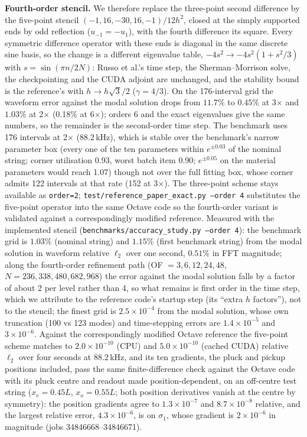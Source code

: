 \documentclass[a4paper,10pt]{article}
\begin{document}
\textbf{Fourth-order stencil.} We therefore replace the three-point second difference by the five-point stencil $(-1,16,-30,16,-1)/12h^2$, closed at the simply supported ends by odd reflection ($u_{-1}=-u_1$), with the fourth difference its square. Every symmetric difference operator with these ends is diagonal in the same discrete sine basis, so the change is a different eigenvalue table, $-4s^2\to-4s^2(1+s^2/3)$ with $s=\sin(\pi n/2N)$: Russo et al.'s time step, the Sherman--Morrison solve, the checkpointing and the CUDA adjoint are unchanged, and the stability bound is the reference's with $h\to h\sqrt{3}/2$ ($\gamma=4/3$). On the 176-interval grid the waveform error against the modal solution drops from $11.7\%$ to $0.45\%$ at 3$\times$ and $1.03\%$ at 2$\times$ (0.18\% at 6$\times$); orders 6 and the exact eigenvalues give the same numbers, so the remainder is the second-order time step. The benchmark uses 176 intervals at 2$\times$ (88.2\,kHz), which is stable over the benchmark's narrow parameter box (every one of the ten parameters within $e^{\pm0.03}$ of the nominal string; corner utilisation 0.93, worst batch item 0.90; $e^{\pm0.05}$ on the material parameters would reach 1.07) though not over the full fitting box, whose corner admits 122 intervals at that rate (152 at 3$\times$). The three-point scheme stays available as \texttt{order=2}; \texttt{test/reference\_paper\_exact.py --order 4} substitutes the five-point operator into the same Octave code so the fourth-order variant is validated against a correspondingly modified reference.
Measured with the implemented stencil (\texttt{benchmarks/accuracy\_study.py --order 4}): the benchmark grid is $1.03\%$ (nominal string) and $1.15\%$ (first benchmark string) from the modal solution in waveform relative $\ell_2$ over one second, $0.51\%$ in FFT magnitude; along the fourth-order refinement path (OF $=3,6,12,24,48$, $N=236,338,480,682,968$) the error against the modal solution falls by a factor of about 2 per level rather than 4, so what remains is first order in the time step, which we attribute to the reference code's startup step (its ``extra $h$ factors''), not to the stencil; the finest grid is $2.5\times10^{-4}$ from the modal solution, whose own truncation (100 vs 123 modes) and time-stepping errors are $1.4\times10^{-5}$ and $3\times10^{-6}$. Against the correspondingly modified Octave reference the five-point scheme matches to $2.0\times10^{-10}$ (CPU) and $5.0\times10^{-10}$ (cached CUDA) relative $\ell_2$ over four seconds at 88.2\,kHz, and its ten gradients, the pluck and pickup positions included, pass the same finite-difference check against the Octave code with its pluck centre and readout made position-dependent, on an off-centre test string ($x_e=0.45L$, $x_o=0.55L$; both position derivatives vanish at the centre by symmetry): the position gradients agree to $1.3\times10^{-7}$ and $8.7\times10^{-8}$ relative, and the largest relative error, $4.3\times10^{-6}$, is on $\sigma_1$, whose gradient is $2\times10^{-6}$ in magnitude (jobs 34846668--34846671).
\end{document}
